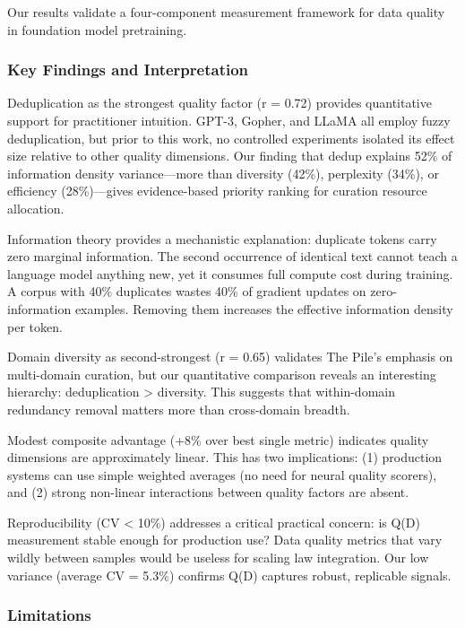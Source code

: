
Our results validate a four-component measurement framework for data quality in foundation model pretraining.

\subsubsection{Key Findings and Interpretation}

Deduplication as the strongest quality factor (r = 0.72) provides quantitative support for practitioner intuition. GPT-3, Gopher, and LLaMA all employ fuzzy deduplication, but prior to this work, no controlled experiments isolated its effect size relative to other quality dimensions. Our finding that dedup explains 52\% of information density variance---more than diversity (42\%), perplexity (34\%), or efficiency (28\%)---gives evidence-based priority ranking for curation resource allocation.

Information theory provides a mechanistic explanation: duplicate tokens carry zero marginal information. The second occurrence of identical text cannot teach a language model anything new, yet it consumes full compute cost during training. A corpus with 40\% duplicates wastes 40\% of gradient updates on zero-information examples. Removing them increases the effective information density per token.

Domain diversity as second-strongest (r = 0.65) validates The Pile's emphasis on multi-domain curation, but our quantitative comparison reveals an interesting hierarchy: deduplication > diversity. This suggests that within-domain redundancy removal matters more than cross-domain breadth.

Modest composite advantage (+8\% over best single metric) indicates quality dimensions are approximately linear. This has two implications: (1) production systems can use simple weighted averages (no need for neural quality scorers), and (2) strong non-linear interactions between quality factors are absent.

Reproducibility (CV < 10\%) addresses a critical practical concern: is Q(D) measurement stable enough for production use? Data quality metrics that vary wildly between samples would be useless for scaling law integration. Our low variance (average CV = 5.3\%) confirms Q(D) captures robust, replicable signals.

\subsubsection{Limitations}

